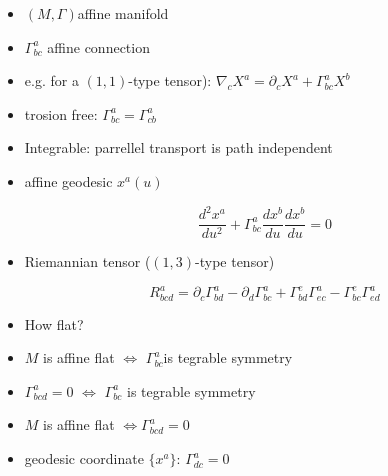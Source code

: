
\begin{itemize}
	\item $(M,\Gamma)$​ affine manifold

\end{itemize}
\begin{itemize}
	\item $\Gamma^{a}_{bc}$ affine connection

\end{itemize}
\begin{itemize}
	\item e.g. for a $(1,1)$-type tensor): $\nabla_{c}X^{a} = \partial_{c}X^{a} + \Gamma^{a}_{bc}X^{b}$

\end{itemize}
\begin{itemize}
	\item trosion free: $\Gamma^{a}_{bc} = \Gamma^{a}_{cb}$

\end{itemize}
\begin{itemize}
	\item Integrable: parrellel transport is path independent

\end{itemize}
\begin{itemize}
	\item affine geodesic $x^{a}(u)$

\begin{equation}
\frac{d^2x^{a}}{du^2} + \Gamma^{a}_{bc}\frac{dx^{b}}{du}\frac{dx^{b}}{du} = 0
\end{equation}

\end{itemize}
\begin{itemize}
	\item Riemannian tensor ($(1,3)$-type tensor)

\begin{equation}
R^{a}_{bcd} =
\partial_{c}\Gamma^{a}_{bd}
- \partial_{d}\Gamma^{a}_{bc}
+ \Gamma^{e}_{bd}\Gamma^{a}_{ec}
- \Gamma^{e}_{bc}\Gamma^{a}_{ed}
\end{equation}

\end{itemize}
\begin{itemize}
	\item How flat?

\end{itemize}
	\begin{itemize}
		\item $M$ is affine flat $\Leftrightarrow$ $\Gamma^{a}_{bc}$​ is tegrable symmetry
		\item $\Gamma^{a}_{bcd} = 0$ $\Leftrightarrow$ $\Gamma^{a}_{bc}$ is tegrable symmetry
		\item $M$ is affine flat $\Leftrightarrow$$\Gamma^{a}_{bcd} = 0$

	\end{itemize}
\begin{itemize}
	\item geodesic coordinate $\{x^{a}\}$: $\Gamma^{a}_{dc} = 0$

\end{itemize}
